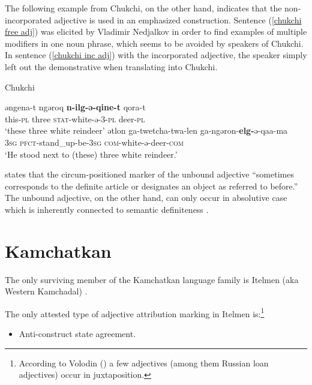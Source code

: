 The following example from Chukchi, on the other hand, indicates that the non-incorporated adjective is used in an emphasized construction. Sentence (\ref{chukchi free adj}) was elicited by Vladimir Nedjalkov \citep[cited as pc in][330]{rijkhoff2002} in order to find examples of multiple modifiers in one noun phrase, which seems to be avoided by speakers of Chukchi. In sentence (\ref{chukchi inc adj}) with the incorporated adjective, the speaker simply left out the demonstrative when translating into Chukchi.
\begin{exe}
\ex \rm{Chukchi \citep[Vladimir Nedjalkov, pc][330]{rijkhoff2002}}
\begin{xlist}
\ex \label{chukchi free adj}
\gll	əngena-t ngəroq \textbf{n-ilg-ə-qine-t} qora-t\\
	this-\textsc{pl} three \textsc{stat}-white-ə-3-\textsc{pl} deer-\textsc{pl}\\
\glt	‘these three white reindeer’
\ex \label{chukchi inc adj}
\gll	ətlon ga-twetcha-twa-len ga-ngəron-\textbf{elg-}ə-qaa-ma\\
	\textsc{3sg} \textsc{pfct}-stand\_up-be-\textsc{3sg} \textsc{com}-white-ə-deer-\textsc{com}\\
\glt	‘He stood next to (these) three white reindeer.’
\end{xlist}
\end{exe}
\citet[716]{bogoras1922} states that the circum-positioned marker of the unbound adjective “sometimes corresponds to the definite article or designates an object as referred to before.” The unbound adjective, on the other hand, can only occur in absolutive case which is inherently connected to semantic definiteness \citep[cf.][207, elsewhere]{dunn1999}.

\section{Kamchatkan}
The only surviving member of the Kamchatkan language family is Itelmen (aka Western Kamchadal) \citep[224]{salminen2007}.

The only attested type of adjective attribution marking in Itelmen is:\footnote{According to Volodin (\citeyear{volodin1997}) a few adjectives (among them Russian loan adjectives) occur in juxtaposition.}
\begin{itemize}
\item Anti-construct state agreement.
\end{itemize}

